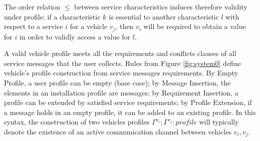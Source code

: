 \documentclass[compsoc, conference, letterpaper, 10pt, times]{IEEEtran}
\newtheorem{definition}{Definition}
\begin{document}
The order relation $\leq$ between service characteristics induces therefore validity under profile: if a characteristic $k$ is essential to another characteristic $l$ with respect to a service $i$ for a vehicle $v_{j}$, then $v_i$ will be required to obtain a value for  $i$ in order to validly access a value for $l$. 

%


A valid vehicle profile meets all the requirements and conflicts clauses of all service messages that the user collects.
Rules from Figure \ref{fig:system0} define vehicle's profile construction from service messages requirements. By Empty Profile, a user profile can be empty (base case); by Message Insertion, the elements in an installation profile are messages; by Requirement Insertion, a profile can be extended by satisfied service requirements; by Profile Extension, if a message holds in an empty profile, it can be added to an existing profile. In this syntax, the construction of two vehicles profiles $\Gamma^{v_{i}}; \Gamma^{v_{j}}: profile$ will typically denote the existence of an active communication channel between vehicles $v_{i}, v_{j}$.
\end{document}
